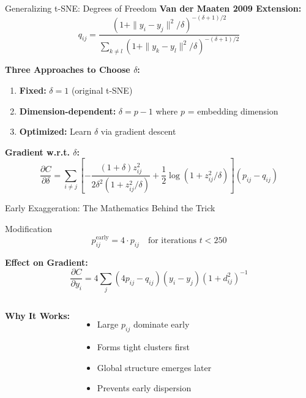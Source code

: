 \documentclass[aspectratio=169]{beamer}
\begin{document}
\begin{frame}{Generalizing t-SNE: Degrees of Freedom}
\textbf{Van der Maaten 2009 Extension:}
$$q_{ij} = \frac{(1 + \|y_i - y_j\|^2/\delta)^{-(\delta+1)/2}}{\sum_{k \neq l}(1 + \|y_k - y_l\|^2/\delta)^{-(\delta+1)/2}}$$

\textbf{Three Approaches to Choose $\delta$:}
\begin{enumerate}
\item \textbf{Fixed:} $\delta = 1$ (original t-SNE)
\item \textbf{Dimension-dependent:} $\delta = p - 1$ where $p$ = embedding dimension
\item \textbf{Optimized:} Learn $\delta$ via gradient descent
\end{enumerate}

\textbf{Gradient w.r.t. $\delta$:}
$$\frac{\partial C}{\partial \delta} = \sum_{i \neq j} \left[-\frac{(1+\delta)z_{ij}^2}{2\delta^2(1 + z_{ij}^2/\delta)} + \frac{1}{2}\log(1 + z_{ij}^2/\delta)\right](p_{ij} - q_{ij})$$
\end{frame}


\begin{frame}{Early Exaggeration: The Mathematics Behind the Trick}
\begin{block}{Modification}
$$p_{ij}^{\text{early}} = 4 \cdot p_{ij} \quad \text{for iterations } t < 250$$
\end{block}

\textbf{Effect on Gradient:}
$$\frac{\partial C}{\partial y_i} = 4\sum_j (4p_{ij} - q_{ij})(y_i - y_j)(1 + d_{ij}^2)^{-1}$$

\begin{columns}
\textbf{Why It Works:}
\begin{itemize}
\item Large $p_{ij}$ dominate early
\item Forms tight clusters first
\item Global structure emerges later
\item Prevents early dispersion
\end{itemize}

\begin{center}
\end{center}
\end{columns}
\end{frame}
\end{document}
